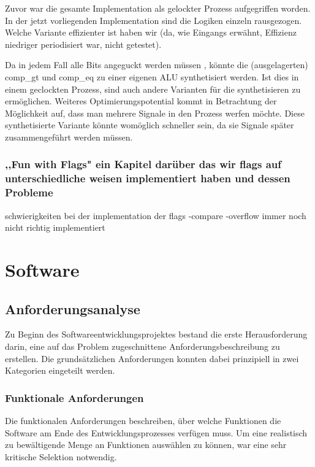 \documentclass[paper=a4,fontsize=12pt,twocolumn]{scrreprt}
\begin{document}
Zuvor war die gesamte Implementation als gelockter Prozess aufgegriffen worden. In der jetzt vorliegenden Implementation sind die Logiken einzeln rausgezogen. Welche Variante effizienter ist haben wir (da, wie Eingangs erwähnt, Effizienz niedriger periodisiert war, nicht getestet).

Da in jedem Fall alle Bits angeguckt werden müssen , könnte die (ausgelagerten) comp\_gt und comp\_eq zu einer eigenen ALU synthetisiert werden. Ist dies in einem geclockten Prozess, sind auch andere Varianten für die synthetisieren zu ermöglichen.
Weiteres Optimierungspotential kommt in Betrachtung der Möglichkeit auf, dass man mehrere Signale in den Prozess werfen möchte. Diese synthetisierte Variante könnte womöglich schneller sein, da sie Signale später zusammengeführt werden müssen.

\subsection{,,Fun with Flags" ein Kapitel darüber das wir flags auf unterschiedliche weisen implementiert haben und dessen Probleme}

schwierigkeiten bei der implementation der flags
-compare
-overflow immer noch nicht richtig implementiert


\chapter{Software}

\section{Anforderungsanalyse}
Zu Beginn des Softwareentwicklungsprojektes bestand die erste Herausforderung darin, eine auf das Problem zugeschnittene Anforderungsbeschreibung zu erstellen.
Die grundsätzlichen Anforderungen konnten dabei prinzipiell in zwei Kategorien eingeteilt werden.

\subsection{Funktionale Anforderungen}


Die funktionalen Anforderungen beschreiben, über welche Funktionen die Software am Ende des Entwicklungsprozesses verfügen muss.
Um eine realistisch zu bewältigende Menge an Funktionen auswählen zu können, war eine sehr kritische Selektion notwendig. 
\end{document}
